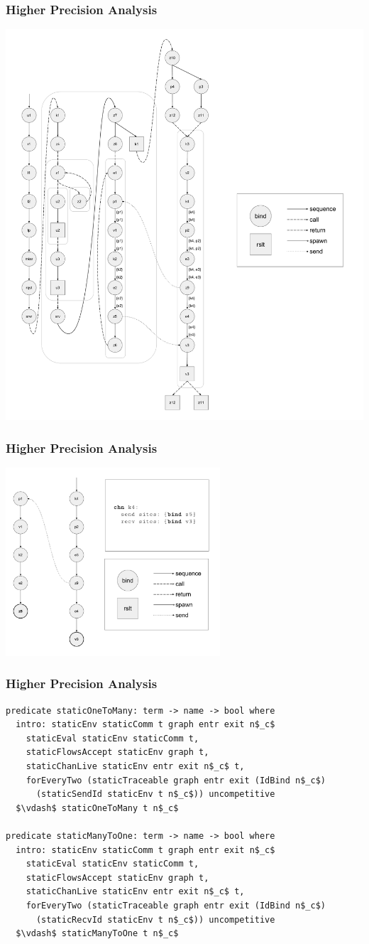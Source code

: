 \documentclass{beamer}
\begin{document}
\begin{frame}
\frametitle{Higher Precision Analysis}
\includegraphics[width=.72\textwidth]{cml-liveness-analysis-k4.pdf}
\end{frame}

\begin{frame}
\frametitle{Higher Precision Analysis}
\includegraphics[width=0.6\textwidth]{cml-graph-k4.pdf}
\end{frame}



\begin{frame}[fragile]
	\frametitle{Higher Precision Analysis}
\begin{lstlisting}[language=logic, mathescape]
predicate staticOneToMany: term -> name -> bool where
  intro: staticEnv staticComm t graph entr exit n$_c$ 
    staticEval staticEnv staticComm t,
    staticFlowsAccept staticEnv graph t,
    staticChanLive staticEnv entr exit n$_c$ t, 
    forEveryTwo (staticTraceable graph entr exit (IdBind n$_c$)
      (staticSendId staticEnv t n$_c$)) uncompetitive
  $\vdash$ staticOneToMany t n$_c$

predicate staticManyToOne: term -> name -> bool where
  intro: staticEnv staticComm t graph entr exit n$_c$ 
    staticEval staticEnv staticComm t,
    staticFlowsAccept staticEnv graph t,
    staticChanLive staticEnv entr exit n$_c$ t, 
    forEveryTwo (staticTraceable graph entr exit (IdBind n$_c$)
      (staticRecvId staticEnv t n$_c$)) uncompetitive
  $\vdash$ staticManyToOne t n$_c$
\end{lstlisting}
\end{frame}
\end{document}
